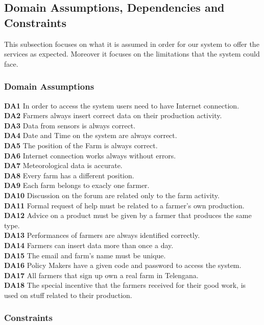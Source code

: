 \subsection{Domain Assumptions, Dependencies and Constraints}
This subsection focuses on what it is assumed in order for our system to offer the services as expected.
Moreover it focuses on the limitations that the system could face.

\subsubsection{Domain Assumptions}
\textbf{DA1} In order to access the system users need to have Internet connection.\\
\textbf{DA2} Farmers always insert correct data on their production activity.\\
\textbf{DA3} Data from sensors is always correct.\\
\textbf{DA4} Date and Time on the system are always correct.\\
\textbf{DA5} The position of the Farm is always correct.\\
\textbf{DA6} Internet connection works always without errors.\\
\textbf{DA7} Meteorological data is accurate.\\
\textbf{DA8} Every farm has a different position.\\
\textbf{DA9} Each farm belongs to exacly one farmer.\\
\textbf{DA10} Discussion on the forum are related only to the farm activity.\\
\textbf{DA11} Formal request of help must be related to a farmer's own production.\\
\textbf{DA12} Advice on a product must be given by a farmer that produces the same type.\\
\textbf{DA13} Performances of farmers are always identified correctly.\\
\textbf{DA14} Farmers can insert data more than once a day.\\
\textbf{DA15} The email and farm's name must be unique.\\
\textbf{DA16} Policy Makers have a given code and password to access the system.\\
\textbf{DA17} All farmers that sign up own a real farm in Telengana.\\
\textbf{DA18} The special incentive that the farmers received for their good work, is used on stuff related to their production. \\


\subsubsection{Constraints}